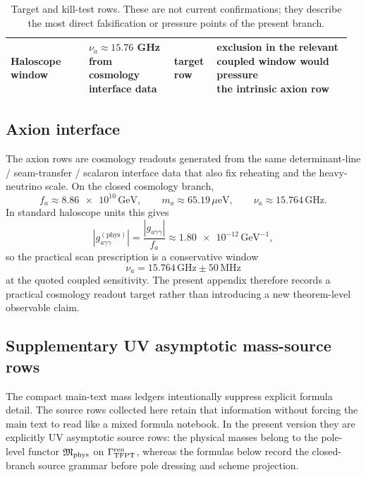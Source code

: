\begin{table}[H]
{\begin{tabular}{@{}>{\raggedright\arraybackslash}p{0.22\linewidth}>{\raggedright\arraybackslash}p{0.24\linewidth}>{\raggedright\arraybackslash}p{0.12\linewidth}>{\raggedright\arraybackslash}p{0.38\linewidth}@{}}
Haloscope window & \makecell[l]{$\nu_a\approx\num{15.76}$ GHz\\from cosmology interface data} & \makecell[l]{target\\row} & \makecell[l]{exclusion in the relevant\\coupled window would pressure\\the intrinsic axion row} \\
\bottomrule
\end{tabular}}
\caption{Target and kill-test rows. These are not current confirmations; they describe the most direct falsification or pressure points of the present branch.}
\label{tab:kill-tests}
\end{table}

\subsection{Axion interface}

The axion rows are cosmology readouts generated from the same determinant-line / seam-transfer /
scalaron interface data that also fix reheating and the heavy-neutrino scale. On the closed
cosmology branch,
\[
f_a\approx \num{8.86e10}\,\mathrm{GeV},
\qquad
m_a\approx \num{65.19}\,\mu\mathrm{eV},
\qquad
\nu_a\approx \num{15.764}\,\mathrm{GHz}.
\]
In standard haloscope units this gives
\[
\left|g_{a\gamma\gamma}^{(\mathrm{phys})}\right|
=
\frac{|g_{a\gamma\gamma}|}{f_a}
\approx
\num{1.80e-12}\,\mathrm{GeV}^{-1},
\]
so the practical scan prescription is a conservative window
\[
\nu_a=\num{15.764}\,\mathrm{GHz}\pm \num{50}\,\mathrm{MHz}
\]
at the quoted coupled sensitivity. The present appendix therefore records a practical cosmology
readout target rather than introducing a new theorem-level observable claim.

\subsection{Supplementary UV asymptotic mass-source rows}

The compact main-text mass ledgers intentionally suppress explicit formula detail. The source rows
collected here retain that information without forcing the main text to read like a mixed formula
notebook. In the present version they are explicitly UV asymptotic source rows: the physical masses
belong to the pole-level functor $\mathfrak M_{\mathrm{phys}}$ on $\Gamma_{\mathrm{TFPT}}^{\mathrm{ren}}$, whereas the formulas below record the
closed-branch source grammar before pole dressing and scheme projection.

